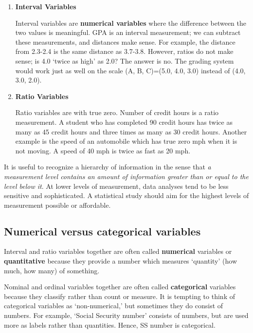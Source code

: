 \documentclass[11pt, chapterprefix=true]{scrbook}\usepackage[]{graphicx}\usepackage[]{color}
\begin{document}
\begin{enumerate}

\item \textbf{Interval Variables}

Interval variables are \textbf{numerical variables} where the difference between the two values is meaningful.  GPA is an interval measurement; we can subtract these measurements, and distances make sense.  For example, the distance from 2.3-2.4 is the same distance as 3.7-3.8.  However, ratios do not make sense; is 4.0 `twice as high' as 2.0?  The answer is no.  The grading system would work just as well on the scale (A, B, C)=(5.0, 4.0, 3.0) instead of (4.0, 3.0, 2.0).

\item \textbf{Ratio Variables}

Ratio variables are  with true zero.  Number of credit hours is a ratio measurement.  A student who has completed 90 credit hours has twice as many as 45 credit hours and three times as many as 30 credit hours.  Another example is the speed of an automobile which has true zero mph when it is not moving.  A speed of 40 mph is twice as fast as 20 mph.
\end{enumerate}

It is useful to recognize a hierarchy of information in the sense that \textit{a measurement level contains an amount of information greater than or equal to the level below it}.  At lower levels of measurement, data analyses tend to be less sensitive and sophisticated.  A statistical study should aim for the highest levels of measurement possible or affordable.

\subsection{Numerical versus categorical variables}

Interval and ratio variables together are often called \textbf{numerical} variables or \textbf{quantitative} because they provide a number which measures `quantity' (how much, how many) of something.

Nominal and ordinal variables together are often called \textbf{categorical} variables because they classify rather than count or measure.  It is tempting to think of categorical variables as `non-numerical,' but sometimes they do consist of numbers.  For example, `Social Security number' consists of numbers, but are used more as labels rather than quantities.  Hence, SS number is categorical.
\end{document}
